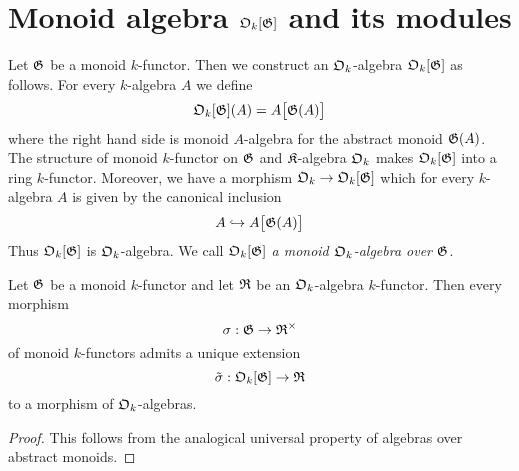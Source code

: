 \section{Monoid algebra ${\mathfrak O}_k[{\mathfrak G}]$ and its modules}

\begin{definition}
Let ${\mathfrak G}$ be a monoid $k$-functor. Then we construct an ${\mathfrak O}_k$-algebra ${\mathfrak O}_k[{\mathfrak G}]$ as follows. For every $k$-algebra $A$ we define
$${\mathfrak O}_k[{\mathfrak G}](A) = A\big[{\mathfrak G}(A)\big]$$
where the right hand side is monoid $A$-algebra for the abstract monoid ${\mathfrak G}(A)$. The structure of monoid $k$-functor on ${\mathfrak G}$ and ${\mathfrak K}$-algebra ${\mathfrak O}_k$ makes ${\mathfrak O}_k[{\mathfrak G}]$ into a ring $k$-functor. Moreover, we have a morphism ${\mathfrak O}_k\rightarrow {\mathfrak O}_k[{\mathfrak G}]$ which for every $k$-algebra $A$ is given by the canonical inclusion
$$A \hookrightarrow A\big[{\mathfrak G}(A)\big]$$
Thus ${\mathfrak O}_k[{\mathfrak G}]$ is ${\mathfrak O}_k$-algebra. We call ${\mathfrak O}_k[{\mathfrak G}]$ \textit{a monoid ${\mathfrak O}_k$-algebra over ${\mathfrak G}$}.
\end{definition}

\begin{fact}\label{fact:universal_property_of_monoid_algebra}
Let ${\mathfrak G}$ be a monoid $k$-functor and let ${\mathfrak R}$ be an ${\mathfrak O}_k$-algebra $k$-functor. Then every morphism
$$\sigma:{\mathfrak G}\rightarrow {\mathfrak R}^{\times}$$
of monoid $k$-functors admits a unique extension
$$\tilde{\sigma}:{\mathfrak O}_k[{\mathfrak G}]\rightarrow {\mathfrak R}$$
to a morphism of ${\mathfrak O}_k$-algebras.
\end{fact}
\begin{proof}
This follows from the analogical universal property of algebras over abstract monoids.
\end{proof}

